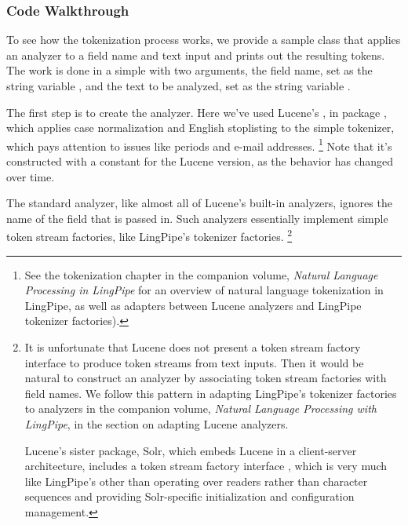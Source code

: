 \subsubsection{Code Walkthrough}

To see how the tokenization process works,
we provide a sample class  that applies an
analyzer to a field name and text input and prints out the resulting
tokens.  The work is done in a simple  with two
arguments, the field name, set as the string variable
, and the text to be analyzed, set as the string
variable .

The first step is to create the analyzer.
%
%
Here we've used Lucene's , in package
, which applies case
normalization and English stoplisting to the simple tokenizer, which
pays attention to issues like periods and e-mail addresses.%
%
\footnote{See the tokenization chapter in the companion volume, {\it
    Natural Language Processing in LingPipe} for an overview of
  natural language tokenization in LingPipe, as well as adapters
  between Lucene analyzers and LingPipe tokenizer factories).}
%
Note that it's constructed with a constant for the Lucene version, as
the behavior has changed over time.

The standard analyzer, like almost all of Lucene's built-in analyzers,
ignores the name of the field that is passed in.  Such analyzers
essentially implement simple token stream factories, like LingPipe's
tokenizer factories.%
%
\footnote{It is unfortunate that Lucene does not present a token
  stream factory interface to produce token streams from text inputs.
  Then it would be natural to construct an analyzer by associating
  token stream factories with field names.  We follow this pattern in
  adapting LingPipe's tokenizer factories to analyzers in the companion
  volume, {\it Natural Language Processing with LingPipe}, in the
  section on adapting Lucene analyzers.

Lucene's sister package, Solr, which embeds Lucene in a client-server
architecture, includes a token stream factory interface
, which is very much like LingPipe's other than
operating over readers rather than character sequences and providing
Solr-specific initialization and configuration management.}


